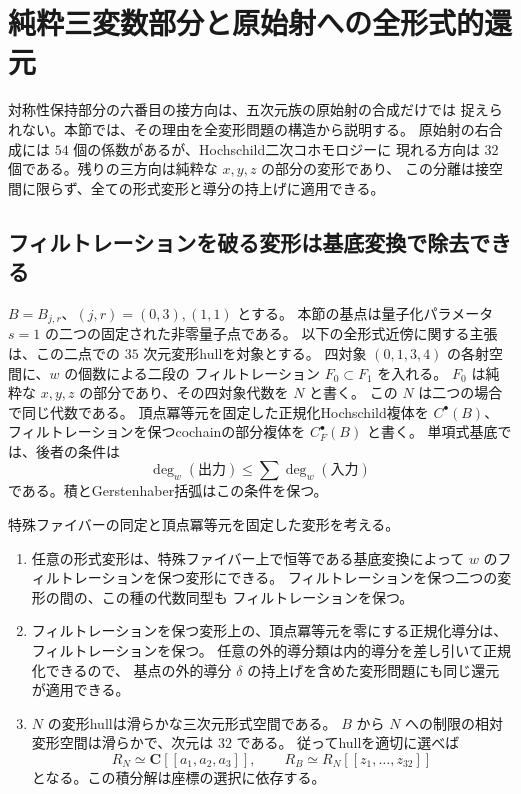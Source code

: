 \section{純粋三変数部分と原始射への全形式的還元}
\label{sec:vk-filtered-reduction-v39}

対称性保持部分の六番目の接方向は、五次元族の原始射の合成だけでは
捉えられない。本節では、その理由を全変形問題の構造から説明する。
原始射の右合成には $54$ 個の係数があるが、Hochschild二次コホモロジーに
現れる方向は $32$ 個である。残りの三方向は純粋な $x,y,z$ の部分の変形であり、
この分離は接空間に限らず、全ての形式変形と導分の持上げに適用できる。

\subsection{フィルトレーションを破る変形は基底変換で除去できる}

$B=B_{j,r}$、$(j,r)=(0,3),(1,1)$ とする。
本節の基点は量子化パラメータ $s=1$ の二つの固定された非零量子点である。
以下の全形式近傍に関する主張は、この二点での $35$ 次元変形hullを対象とする。
四対象 $(0,1,3,4)$ の各射空間に、$w$ の個数による二段の
フィルトレーション $F_0\subset F_1$ を入れる。
$F_0$ は純粋な $x,y,z$ の部分であり、その四対象代数を $N$ と書く。
この $N$ は二つの場合で同じ代数である。
頂点冪等元を固定した正規化Hochschild複体を $C^\bullet(B)$、
フィルトレーションを保つcochainの部分複体を $C_F^\bullet(B)$ と書く。
単項式基底では、後者の条件は
\[
 \deg_w(\text{出力})\le
 \sum\deg_w(\text{入力})
\]
である。積とGerstenhaber括弧はこの条件を保つ。

\begin{theorem}[全形式変形のフィルトレーションによる還元]
\label{thm:vk-filtered-reduction-v39}
特殊ファイバーの同定と頂点冪等元を固定した変形を考える。
\begin{enumerate}
\item 任意の形式変形は、特殊ファイバー上で恒等である基底変換によって
$w$ のフィルトレーションを保つ変形にできる。
フィルトレーションを保つ二つの変形の間の、この種の代数同型も
フィルトレーションを保つ。
\item フィルトレーションを保つ変形上の、頂点冪等元を零にする正規化導分は、
フィルトレーションを保つ。
任意の外的導分類は内的導分を差し引いて正規化できるので、
基点の外的導分 $\delta$ の持上げを含めた変形問題にも同じ還元が適用できる。
\item $N$ の変形hullは滑らかな三次元形式空間である。
$B$ から $N$ への制限の相対変形空間は滑らかで、次元は $32$ である。
従ってhullを適切に選べば
\[
 R_N\simeq\mathbf C[[a_1,a_2,a_3]],\qquad
 R_B\simeq R_N[[z_1,\ldots,z_{32}]]
\]
となる。この積分解は座標の選択に依存する。
\end{enumerate}
\end{theorem}

